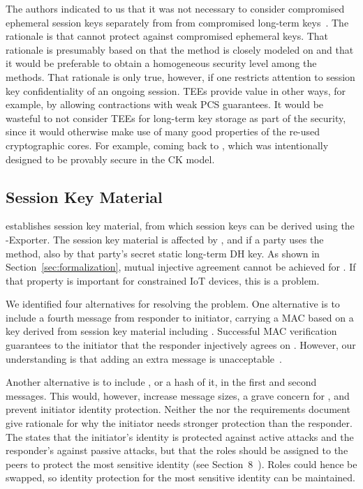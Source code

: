 \documentclass[runningheads, envcountsame, a4paper, draft, x11names]{llncs}
\begin{document}
The \mEdhoc{} authors indicated to us that it was
not necessary to consider compromised ephemeral session keys separately from
from compromised long-term keys~\cite{personalCommunication}.
%
The rationale is that \mSigma{} cannot protect against compromised ephemeral
keys.
%
That rationale is presumably based on that the \mSigSig{} method is
closely modeled on \mSigmaI{} and that it would be preferable to obtain a
homogeneous security level among the \mEdhoc{}
methods\cite{personalCommunication}.
%
That rationale is only true, however, if one restricts attention to session key
confidentiality of an ongoing session.
%
TEEs provide value in other ways, for example, by allowing contractions with
weak PCS guarantees.
%
It would be wasteful to not consider TEEs for long-term key storage as part of
the security, since it would otherwise make use of many good properties of the
re-used cryptographic cores.
%
For example, coming back to \mOptls{}, which was intentionally
designed to be provably secure in the CK model.
%

 
\subsection{Session Key Material}
\label{sec:sessionKeyMaterial}
 
\mEdhoc{} establishes session key material, from which session keys
can be derived using the \mEdhoc{}-Exporter.
%
The session key material is affected by \mGxy{}, and if a party uses the
\mStat{} method, also by that party's secret static long-term DH key.
%
As shown in Section~\ref{sec:formalization}, mutual injective agreement cannot
be achieved for \mGiy{}.
%
If that property is important for constrained IoT devices, this is a problem.
%

We identified four alternatives for resolving the problem.
%
One alternative is to include a fourth message from responder to initiator,
carrying a MAC based on a key derived from session key
material including \mGiy{}.
%
Successful MAC verification guarantees
to the initiator that the responder injectively agrees on \mGiy{}.
%
However, our understanding is that adding an extra message is
unacceptable~\cite{personalCommunication}.
%

Another alternative is to include \mGi{}, or a hash of it, in the first and
second messages.
%
This would, however, increase message sizes, a grave concern for \mEdhoc{},
and prevent initiator identity protection.
%
Neither the \mSpec{} nor the requirements document give rationale for why the
initiator needs stronger protection than the responder.
%
The \mSpec{} states that the initiator's identity is protected against active
attacks and the responder's against passive attacks, but that the roles should
be assigned to the \mCoap{} peers to protect the most sensitive identity (see Section~8~\cite{selander-lake-edhoc-01}).
%
Roles could hence be swapped, so identity protection for the most sensitive
identity can be maintained.
%
\end{document}
